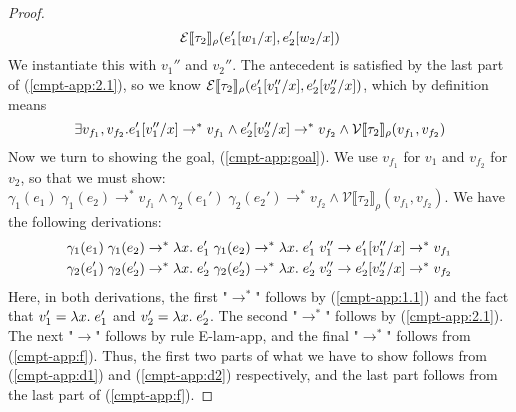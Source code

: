 \documentclass[twoside,11pt,openright]{report}
\theoremstyle{definition}
\newcommand{\var}{x}
\newcommand{\expr}{e}
\newcommand{\val}{v}
\newcommand{\valB}{w}
\newcommand{\subst}[3]{#1{\left[#3 \middle/ #2 \right]}}
\newcommand{\typ}{\tau}
\newcommand{\step}{\rightarrow}
\newcommand{\stepS}{\rightarrow^*}
\newcommand{\ValInp}[2]{\mathcal{V} \llbracket #1 \rrbracket_{#2}}
\newcommand{\ExpInp}[2]{\mathcal{E} \llbracket #1 \rrbracket_{#2}}
\begin{document}
\begin{proof}
\begin{equation}
    \ExpInp{\typ_2}{\rho}(\subst{\expr_1'}{\var}{\valB_1}, \subst{\expr_2'}{\var}{\valB_2})
  \end{equation}
  We instantiate this with $\val_1''$ and $\val_2''$. The antecedent is satisfied by the last part of (\ref*{cmpt-app:2.1}), so we know $\ExpInp{\typ_2}{\rho}(\subst{\expr_1'}{\var}{\val_1''}, \subst{\expr_2'}{\var}{\val_2''})$, which by definition means
  \begin{equation}
    \exists \val_{f_1}, \val_{f_2} . \subst{\expr_1'}{\var}{\val_1''} \stepS \val_{f_1} \land \subst{\expr_2'}{\var}{\val_2''} \stepS \val_{f_2} \land \ValInp{\typ_2}{\rho}(\val_{f_1}, \val_{f_2})\label{cmpt-app:f}
  \end{equation}
  Now we turn to showing the goal, (\ref*{cmpt-app:goal}). We use $\val_{f_1}$ for $\val_1$ and $\val_{f_2}$ for $\val_2$, so that we must show:
  $\gamma_1(\expr_1) \; \gamma_1(\expr_2) \stepS \val_{f_1} \land \gamma_2(\expr_1') \; \gamma_2(\expr_2') \stepS \val_{f_2} \land \ValInp{\typ_2}{\rho}(\val_{f_1}, \val_{f_2})$. We have the following derivations:
  \begin{align}
    &\gamma_1(\expr_1) \; \gamma_1(\expr_2) \stepS \fun \var . \expr_1' \; \gamma_1(\expr_2) \stepS \fun \var . \expr_1' \; \val_1'' \step \subst{\expr_1'}{\var}{\val_1''} \stepS \val_{f_1}\label{cmpt-app:d1}\\
    &\gamma_2(\expr_1') \; \gamma_2(\expr_2') \stepS \fun \var . \expr_2' \; \gamma_2(\expr_2') \stepS \fun \var . \expr_2' \; \val_2'' \step \subst{\expr_2'}{\var}{\val_2''} \stepS \val_{f_2}\label{cmpt-app:d2}
  \end{align}
  Here, in both derivations, the first "$\stepS$" follows by (\ref*{cmpt-app:1.1}) and the fact that $\val_1' = \fun \var . \expr_1'$ and $\val_2' = \fun \var . \expr_2'$. The second "$\stepS$" follows by (\ref*{cmpt-app:2.1}). The next "$\step$" follows by rule E-lam-app, and the final "$\stepS$" follows from (\ref*{cmpt-app:f}). Thus, the first two parts of what we have to show follows from (\ref{cmpt-app:d1}) and (\ref*{cmpt-app:d2}) respectively, and the last part follows from the last part of (\ref*{cmpt-app:f}).
\end{proof}
\end{document}

